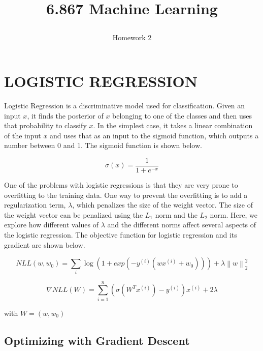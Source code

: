 \documentclass[10pt,twoside]{article}
\begin{document}
\title{6.867 Machine Learning  \subtitle{Homework 2} }

\maketitle


\section{\uppercase{Logistic Regression}}

\noindent Logistic Regression is a discriminative model used for classification. Given an input $x$, it finds the posterior of $x$ belonging to one of the classes and then uses that probability to classify $x$. In the simplest case, it takes a linear combination of the input $x$ and uses that as an input to the sigmoid function, which outputs a number between 0 and 1. The sigmoid function is shown below. 

\begin{equation}
\sigma(x) = \frac{1}{1+e^{-x}}
\end{equation}

One of the problems with logistic regressions is that they are very prone to overfitting to the training data. One way to prevent the overfitting is to add a regularization term, $\lambda$, which penalizes the size of the weight vector. The size of the weight vector can be penalized using the $L_1$ norm and the $L_2$ norm. Here, we explore how different values of $\lambda$  and the different norms affect several aspects of the logistic regression. The objective function for logistic regression and its gradient are shown below. 

\begin{equation}
NLL(w,w_0) = \sum_i \log(1+exp(-y^{(i)}(wx^{(i)}+w_0))) + \lambda \left \| w \right \|_2^2
\end{equation}

\begin{equation}
\nabla NLL(W) = \sum_{i=1}^n (\sigma (W^Tx^{(i)})-y^{(i)})x^{(i)} + 2\lambda 
\end{equation}

with $W = (w,w_0)$



\subsection{Optimizing with Gradient Descent}
\end{document}
